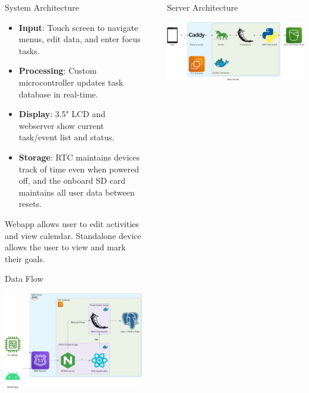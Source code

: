 \documentclass[final]{beamer}
\newlength{\sepwidth}
\newlength{\colwidth}
\newcommand{\separatorcolumn}{\begin{column}{\sepwidth}\end{column}}
\begin{document}
\begin{frame}[t]
\begin{columns}[t]
\begin{column}{\colwidth}
    \begin{block}{System Architecture} %
    
    \begin{itemize}
      \item \textbf{Input}: Touch screen to navigate menus, edit data, and enter focus tasks.
      \item \textbf{Processing}: Custom microcontroller updates task database in real-time.
      \item \textbf{Display}: 3.5" LCD and webserver show current task/event list and status.
      \item \textbf{Storage}: RTC maintains devices track of time even when powered off, and the onboard SD card maintains all user data between resets.
    \end{itemize}

    Webapp allows user to edit activities and view calendar. Standalone device allows the user to view and mark their goals.

  \end{block}

  \begin{block}{Data Flow}
    \vskip 0.5cm
    \begin{center}
      \includegraphics[width = 0.8 \linewidth]{data_flow.png}
    \end{center}
  \end{block}
\end{column}

\separatorcolumn

\begin{column}{\colwidth}
  \begin{block}{Server Architecture}
    \vskip 0.5cm
    \begin{center}
      \includegraphics[width = 0.8 \linewidth]{web_server.png}
    \end{center}
  \end{block}


\end{column}
\end{columns}
\end{frame}
\end{document}
